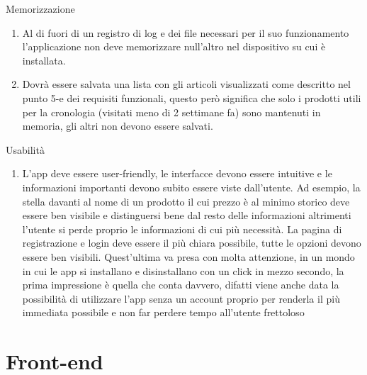 \documentclass{article}
\begin{document}
Memorizzazione
\begin{enumerate}
    \item Al di fuori di un registro di log e dei file necessari per il suo funzionamento l’applicazione non deve memorizzare null'altro nel
            dispositivo su cui è installata.
   \item Dovrà essere salvata una lista con gli articoli visualizzati come descritto nel punto 5-e dei requisiti funzionali, questo però significa che solo i prodotti
        utili per la cronologia (visitati meno di 2 settimane fa) sono mantenuti in memoria, gli altri non devono essere salvati.
\end{enumerate}
Usabilità
\begin{enumerate}
    \item L’app deve essere user-friendly, le interfacce devono essere intuitive e le informazioni importanti devono subito essere viste
            dall’utente. Ad esempio, la stella davanti al nome di un prodotto il cui prezzo è al minimo storico deve essere ben visibile
            e distinguersi bene dal resto delle informazioni altrimenti l’utente si perde proprio le informazioni di cui più necessità.
            La pagina di registrazione e login deve essere il più chiara possibile, tutte le opzioni devono essere ben visibili. Quest’ultima
            va presa con molta attenzione, in un mondo in cui le app si installano e disinstallano con un click in mezzo secondo, la prima
            impressione è quella che conta davvero, difatti viene anche data la possibilità di utilizzare l’app senza un account proprio per
            renderla il più immediata possibile e non far perdere tempo all’utente frettoloso
\end{enumerate}
\section{Front-end}
\end{document}
